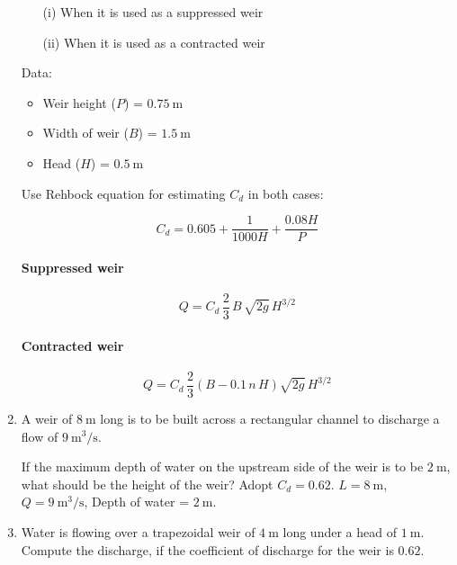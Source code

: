 \documentclass[10pt, a4paper]{exam}
\begin{document}
\begin{enumerate}
    \begin{itemize}
        \item[(i)] When it is used as a suppressed weir
        \item[(ii)] When it is used as a contracted weir
    \end{itemize}

    Data: 
    
    \begin{itemize}
    \item Weir height ($P$) = $0.75 \ \mathrm{m}$
    \item Width of weir ($B$) = $1.5 \ \mathrm{m}$
    \item Head ($H$) = $0.5 \ \mathrm{m}$
    \end{itemize}
    
    Use Rehbock equation for estimating $C_d$ in both cases:
    
    \begin{equation}
        C_d = 0.605 + \frac{1}{1000H} + \frac{0.08 H}{P}
    \end{equation}
    
    \paragraph{Suppressed weir}
    
    \begin{equation}
        Q = C_d \, \frac{2}{3} \, B \, \sqrt{2g} \, H^{3/2}
    \end{equation}
    
    \paragraph{Contracted weir}
    \begin{equation}
        Q = C_d \, \frac{2}{3} \left( B - 0.1 \, n \, H \right) \sqrt{2g} \, H^{3/2}
    \end{equation}

    \item A weir of $8 \ \mathrm{m}$ long is to be built across a rectangular channel to discharge a flow of $9 \ \mathrm{m}^3/\mathrm{s}$.

    If the maximum depth of water on the upstream side of the weir is to be $2 \ \mathrm{m}$, what should be the height of the weir? Adopt $C_d = 0.62$. $L = 8 \ \mathrm{m}$, $Q = 9 \ \mathrm{m}^3/\mathrm{s}$, Depth of water = $2 \ \mathrm{m}$.


    \item Water is flowing over a trapezoidal weir of $4 \ \mathrm{m}$ long under a head of $1 \ \mathrm{m}$. Compute the discharge, if the coefficient of discharge for the weir is $0.62$.


\end{enumerate}
\end{document}
